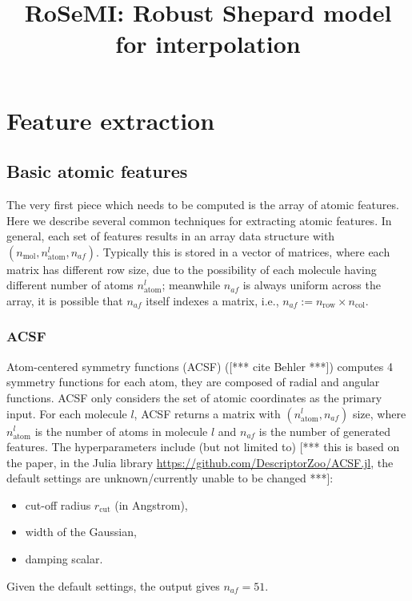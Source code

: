 \documentclass[12pt]{article}
\title{RoSeMI: Robust Shepard model for interpolation}
\def\att{                    %
        \marginpar[ \hspace*{\fill} \raisebox{-0.2em}{\rule{2mm}{1.2em}} ]
        {\raisebox{-0.2em}{\rule{2mm}{1.2em}} }
        }
\def\at#1{[*** \att #1 ***]}  %
\begin{document}
\maketitle

\section{Feature extraction}
\label{sec:feature_extraction}

\subsection{Basic atomic features}
\label{subsec:basic_atomic_features}
The very first piece which needs to be computed is the array of atomic features. 
Here we describe several common techniques for extracting atomic features. In general, each set of features results in an array data structure with $(n_\text{mol}, n^l_\text{atom}, n_{af})$. Typically this is stored in a vector of matrices, where each matrix has different row size, due to the possibility of each molecule having different number of atoms $n^l_\text{atom}$; meanwhile $n_{af}$ is always uniform across the array, it is possible that $n_{af}$ itself indexes a matrix, i.e., $n_{af} := n_\text{row} \times n_\text{col}$. 

\subsubsection{ACSF}
Atom-centered symmetry functions (ACSF) (\at{cite Behler}) computes 4 symmetry functions for each atom, they are composed of radial and angular functions. ACSF only considers the set of atomic coordinates as the primary input. For each molecule $l$, ACSF returns a matrix with $(n^l_\text{atom}, n_{af})$ size, where $n^l_\text{atom}$ is the number of atoms in molecule $l$ and $n_{af}$ is the number of generated features. The hyperparameters include (but not limited to) \at{this is based on the paper, in the Julia library \url{https://github.com/DescriptorZoo/ACSF.jl}, the default settings are unknown/currently unable to be changed}:
\begin{itemize}
	\item cut-off radius $r_\text{cut}$ (in Angstrom),
	\item width of the Gaussian,
	\item damping scalar.
\end{itemize}
Given the default settings, the output gives $n_{af} = 51$.
\end{document}
